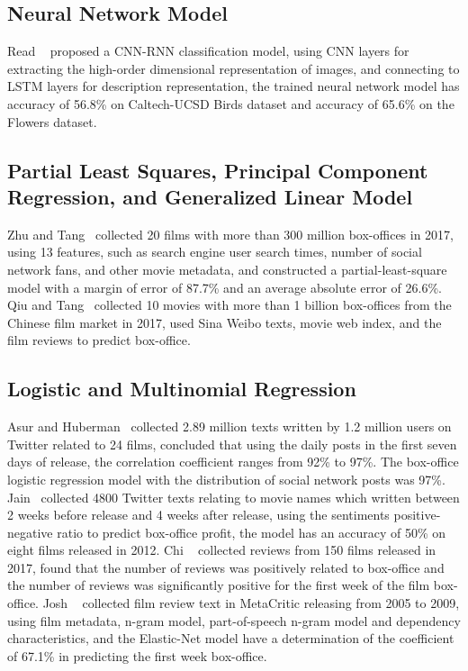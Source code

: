 \documentclass[review]{cvpr}
\begin{document}
\subsection{Neural Network Model}

  Read \etal ~\cite{read2016learning} proposed a CNN-RNN classification model, using CNN layers for extracting the high-order dimensional representation of images,
  and connecting to LSTM layers for description representation, the trained neural network model has accuracy of 56.8\% on Caltech-UCSD Birds dataset and accuracy of 65.6\% on the Flowers dataset.


\subsection{Partial Least Squares, Principal Component Regression, and Generalized Linear Model}

  Zhu and Tang~\cite{zhu2019film} collected 20 films with more than 300 million box-offices in 2017, using 13 features, such as search engine user search times, number of social network fans, and other movie metadata,
  and constructed a partial-least-square model with a margin of error of 87.7\% and an average absolute error of 26.6\%.
  Qiu and Tang~\cite{qiu2018microblog} collected 10 movies with more than 1 billion box-offices from the Chinese film market in 2017, used Sina Weibo texts, movie web index, and the film reviews to predict box-office.

\subsection{Logistic and Multinomial Regression}

  Asur and Huberman~\cite{asur2010predicting} collected 2.89 million texts written by 1.2 million users on Twitter related to 24 films,
  concluded that using the daily posts in the first seven days of release, the correlation coefficient ranges from 92\% to 97\%.
  The box-office logistic regression model with the distribution of social network posts was 97\%.
  Jain~\cite{jain2013prediction} collected 4800 Twitter texts relating to movie names which written between 2 weeks before release and 4 weeks after release,
  using the sentiments positive-negative ratio to predict box-office profit, the model has an accuracy of 50\% on eight films released in 2012.
  Chi \etal~\cite{chi2019does} collected reviews from 150 films released in 2017, found that the number of reviews was positively related to box-office
  and the number of reviews was significantly positive for the first week of the film box-office.
  Josh \etal~\cite{joshi2010movie} collected film review text in MetaCritic releasing from 2005 to 2009, using film metadata, n-gram model,
  part-of-speech n-gram model and dependency characteristics, and the Elastic-Net model have a determination of the coefficient of 67.1\% in predicting the first week box-office.
\end{document}

